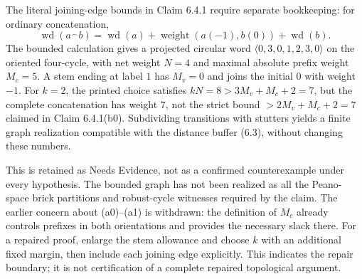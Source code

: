 \documentclass[10pt]{article}
\begin{document}
The literal joining-edge bounds in Claim 6.4.1 require separate bookkeeping: for ordinary concatenation, \[\operatorname{wd}(a^\frown b)=\operatorname{wd}(a)+\operatorname{weight}(a(-1),b(0))+\operatorname{wd}(b).\] The bounded calculation gives a projected circular word \(\langle0,3,0,1,2,3,0\rangle\) on the oriented four-cycle, with net weight \(N=4\) and maximal absolute prefix weight \(M_c=5\). A stem ending at label \(1\) has \(M_v=0\) and joins the initial \(0\) with weight \(-1\). For \(k=2\), the printed choice satisfies \(kN=8>3M_v+M_c+2=7\), but the complete concatenation has weight \(7\), not the strict bound \(>2M_v+M_c+2=7\) claimed in Claim 6.4.1(b0). Subdividing transitions with stutters yields a finite graph realization compatible with the distance buffer (6.3), without changing these numbers.\par
This is retained as Needs Evidence, not as a confirmed counterexample under every hypothesis. The bounded graph has not been realized as all the Peano-space brick partitions and robust-cycle witnesses required by the claim. The earlier concern about (a0)–(a1) is withdrawn: the definition of \(M_c\) already controls prefixes in both orientations and provides the necessary slack there. For a repaired proof, enlarge the stem allowance and choose \(k\) with an additional fixed margin, then include each joining edge explicitly. This indicates the repair boundary; it is not certification of a complete repaired topological argument.\par
\end{document}
